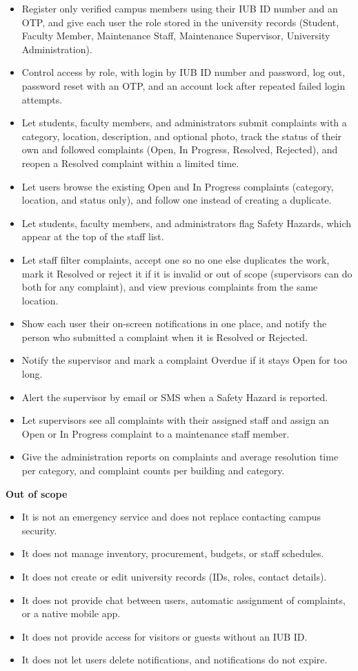 \begin{itemize}
  \item Register only verified campus members using their IUB ID number and an OTP, and give each user the role stored in the university records (Student, Faculty Member, Maintenance Staff, Maintenance Supervisor, University Administration).
  \item Control access by role, with login by IUB ID number and password, log out, password reset with an OTP, and an account lock after repeated failed login attempts.
  \item Let students, faculty members, and administrators submit complaints with a category, location, description, and optional photo, track the status of their own and followed complaints (Open, In Progress, Resolved, Rejected), and reopen a Resolved complaint within a limited time.
  \item Let users browse the existing Open and In Progress complaints (category, location, and status only), and follow one instead of creating a duplicate.
  \item Let students, faculty members, and administrators flag Safety Hazards, which appear at the top of the staff list.
  \item Let staff filter complaints, accept one so no one else duplicates the work, mark it Resolved or reject it if it is invalid or out of scope (supervisors can do both for any complaint), and view previous complaints from the same location.
  \item Show each user their on-screen notifications in one place, and notify the person who submitted a complaint when it is Resolved or Rejected.
  \item Notify the supervisor and mark a complaint Overdue if it stays Open for too long.
  \item Alert the supervisor by email or SMS when a Safety Hazard is reported.
  \item Let supervisors see all complaints with their assigned staff and assign an Open or In Progress complaint to a maintenance staff member.
  \item Give the administration reports on complaints and average resolution time per category, and complaint counts per building and category.
\end{itemize}

\textbf{Out of scope}

\begin{itemize}
  \item It is not an emergency service and does not replace contacting campus security.
  \item It does not manage inventory, procurement, budgets, or staff schedules.
  \item It does not create or edit university records (IDs, roles, contact details).
  \item It does not provide chat between users, automatic assignment of complaints, or a native mobile app.
  \item It does not provide access for visitors or guests without an IUB ID.
  \item It does not let users delete notifications, and notifications do not expire.
\end{itemize}

